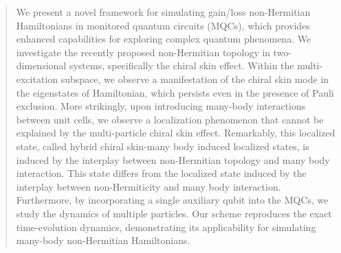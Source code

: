 \documentclass[longbibliography, aps, prx, amsmath, amssymb, amsfonts, twocolumn,superscriptaddress, footinbib]{revtex4-1}
\begin{document}
\begin{abstract}
		We present a novel framework for simulating gain/loss non-Hermitian Hamiltonians in monitored quantum circuits (MQCs), which provides enhanced capabilities for exploring complex quantum phenomena. We investigate the recently proposed non-Hermitian topology in two-dimensional systems, specifically the chiral skin effect. Within the multi-excitation subspace, we observe a manifestation of the chiral skin mode in the eigenstates of Hamiltonian, which persists even in the presence of Pauli exclusion. More strikingly, upon introducing many-body interactions between unit cells, we observe a localization phenomenon that cannot be explained by the multi-particle chiral skin effect. 
		Remarkably, this localized state, called hybrid chiral skin-many body induced localized states, is induced by the interplay between non-Hermitian topology and many body interaction. This state differs from the localized state induced by the interplay between non-Hermiticity and many body interaction.
		Furthermore, by incorporating a single auxiliary qubit into the MQCs, we study the dynamics of multiple particles. Our scheme reproduces the exact time-evolution dynamics, demonstrating its applicability for simulating many-body non-Hermitian Hamiltonians.




\end{abstract}
\end{document}
